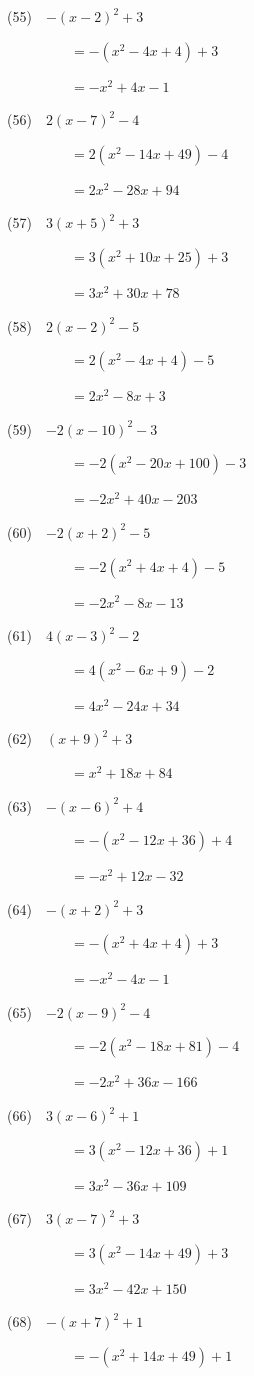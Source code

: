 \documentclass[a4j,twocolumn,10pt,fleqn]{jarticle}
\begin{document}
(55)~~$-(x-2)^2 +3$

~~~~~~~~~$=-(x^2-4x +4) +3$

~~~~~~~~~$=-x^2 +4x-1$

(56)~~$2(x-7)^2-4$

~~~~~~~~~$=2(x^2-14x +49)-4$

~~~~~~~~~$=2x^2-28x +94$

(57)~~$3(x +5)^2 +3$

~~~~~~~~~$=3(x^2 +10x +25) +3$

~~~~~~~~~$=3x^2 +30x +78$

(58)~~$2(x-2)^2-5$

~~~~~~~~~$=2(x^2-4x +4)-5$

~~~~~~~~~$=2x^2-8x +3$

(59)~~$-2(x-10)^2-3$

~~~~~~~~~$=-2(x^2-20x +100)-3$

~~~~~~~~~$=-2x^2 +40x-203$

(60)~~$-2(x +2)^2-5$

~~~~~~~~~$=-2(x^2 +4x +4)-5$

~~~~~~~~~$=-2x^2-8x-13$

(61)~~$4(x-3)^2-2$

~~~~~~~~~$=4(x^2-6x +9)-2$

~~~~~~~~~$=4x^2-24x +34$

(62)~~$(x +9)^2 +3$

~~~~~~~~~$=x^2 +18x +84$

(63)~~$-(x-6)^2 +4$

~~~~~~~~~$=-(x^2-12x +36) +4$

~~~~~~~~~$=-x^2 +12x-32$

(64)~~$-(x +2)^2 +3$

~~~~~~~~~$=-(x^2 +4x +4) +3$

~~~~~~~~~$=-x^2-4x-1$

(65)~~$-2(x-9)^2-4$

~~~~~~~~~$=-2(x^2-18x +81)-4$

~~~~~~~~~$=-2x^2 +36x-166$

(66)~~$3(x-6)^2 +1$

~~~~~~~~~$=3(x^2-12x +36) +1$

~~~~~~~~~$=3x^2-36x +109$

(67)~~$3(x-7)^2 +3$

~~~~~~~~~$=3(x^2-14x +49) +3$

~~~~~~~~~$=3x^2-42x +150$

(68)~~$-(x +7)^2 +1$

~~~~~~~~~$=-(x^2 +14x +49) +1$
\end{document}
